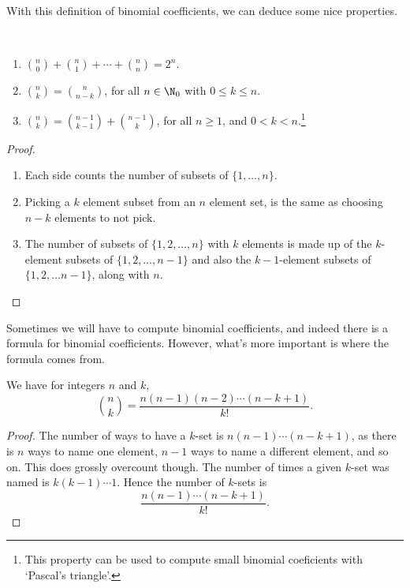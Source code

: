 With this definition of binomial coefficients, we can deduce some nice properties.

\begin{proposition}~
	\vspace{-1.5\baselineskip}
	\begin{enumerate}[label=(\roman*)]
	\item $\binom{n}{0} + \binom{n}{1} + \cdots + \binom{n}{n} = 2^n$.
	\item $\binom{n}{k} = \binom{n}{n - k}$, for all $n \in \N_0$ with $0 \leq k \leq n$.
	\item $\binom{n}{k} = \binom{n - 1}{k - 1} + \binom{n - 1}{k}$, for all $n \geq 1$, and $0 < k < n$.\footnote{This property can be used to compute small binomial coeficients with `Pascal's triangle'.}
\end{enumerate}	
\end{proposition}
\begin{proof}
	\begin{enumerate}[label=(\roman*)]
		\item Each side counts the number of subsets of $\{1, \dots, n\}$.
		\item Picking a $k$ element subset from an $n$ element set, is the same as choosing $n - k$ elements to not pick.
		\item The number of subsets of $\{1, 2, \dots, n\}$ with $k$ elements is made up of the $k$-element subsets of $\{1, 2, \dots, n - 1\}$ and also the $k - 1$-element subsets of $\{1, 2, \dots n - 1\}$, along with $n$.
	\end{enumerate}
\end{proof}

Sometimes we will have to compute binomial coefficients, and indeed there is a formula for binomial coefficients. However, what's more important is where the formula comes from.


\begin{proposition}
	We have for integers $n$ and $k$,
	$$
	\binom{n}{k} = \frac{n(n - 1)(n - 2)\cdots (n - k + 1)}{k!}.
	$$
\end{proposition}
\begin{proof}
	The number of ways to have a $k$-set is $n(n - 1)\cdots(n - k + 1)$, as there is $n$ ways to name one element, $n - 1$ ways to name a different element, and so on. This does grossly overcount though. The number of times a given $k$-set was named is $k(k - 1)\cdots 1$. Hence the number of $k$-sets is
	$$
	\frac{n(n - 1)\cdots(n - k + 1)}{k!}.
	$$
\end{proof}

